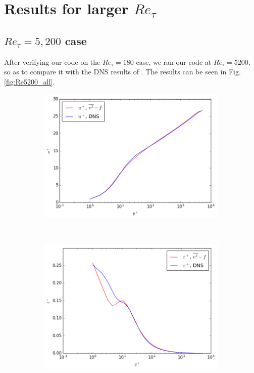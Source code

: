 \documentclass[a4paper,11pt]{article}
\begin{document}
\section{Results for larger $Re_\tau$}


\subsection{$Re_\tau = 5,200$ case}
After verifying our code on the $Re_{\tau} = 180$ case, we ran our code at $Re_{\tau} = 5200$, so as to compare it with the DNS results of \cite{Lee}. The results can be seen in Fig. \ref{fig:Re5200_all}.
\begin{figure}
	\centering
	\begin{subfigure}[b]{0.45\textwidth} %
		\includegraphics[width=\textwidth]{U_5200}
		\caption{}
		\label{fig:results_U_5200}
	\end{subfigure}
	~
	\begin{subfigure}[b]{0.45\linewidth} %
		\includegraphics[width=\textwidth]{eps_5200}
		\caption{}
		\label{fig:results_k_5200}
	\end{subfigure}
	

\end{figure}
\end{document}
